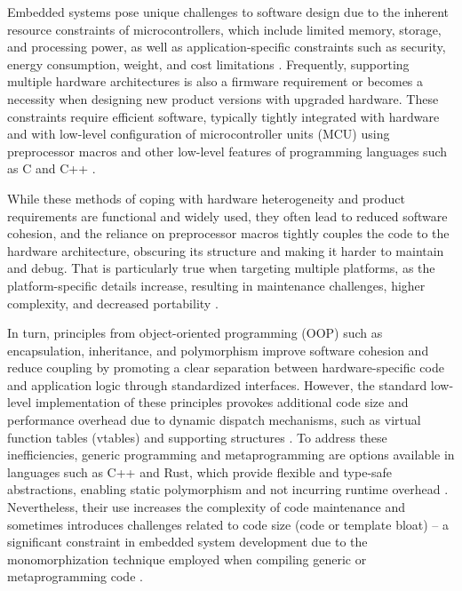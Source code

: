 \documentclass[10pt,sigplan,screen,anonymous]{acmart}
\begin{document}
Embedded systems pose unique challenges to software design due to the inherent resource constraints of microcontrollers, which include limited memory, storage, and processing power, as well as application-specific constraints such as security, energy consumption, weight, and cost limitations \cite{buttazzo2006}. Frequently, supporting multiple hardware architectures is also a firmware requirement or becomes a necessity when designing new product versions with upgraded hardware. These constraints require efficient software, typically tightly integrated with hardware and with low-level configuration of microcontroller units (MCU) using preprocessor macros and other low-level features of programming languages such as C and C++ \cite{varoumas2023}.

While these methods of coping with hardware heterogeneity and product requirements are functional and widely used, they often lead to reduced software cohesion, and the reliance on preprocessor macros tightly couples the code to the hardware architecture, obscuring its structure and making it harder to maintain and debug. That is particularly true when targeting multiple platforms, as the platform-specific details increase, resulting in maintenance challenges, higher complexity, and decreased portability \cite{pappas2024semantic,ernst2002empirical,cppdesign}.

In turn, principles from object-oriented programming (OOP) such as encapsulation, inheritance, and polymorphism improve software cohesion and reduce coupling by promoting a clear separation between hardware-specific code and application logic through standardized interfaces. However, the standard low-level implementation of these principles provokes additional code size and performance overhead due to dynamic dispatch mechanisms, such as virtual function tables (vtables) and supporting structures \cite{bauer2021novt}. To address these inefficiencies, generic programming and metaprogramming are options available in languages such as C++ and Rust, which provide flexible and type-safe abstractions, enabling static polymorphism and not incurring runtime overhead \cite{juhasz2023modern}. Nevertheless, their use increases the complexity of code maintenance and sometimes introduces challenges related to code size (code or template bloat) -- a significant constraint in embedded system development due to the monomorphization technique employed when compiling generic or metaprogramming code \cite{rust2022}.
\end{document}
